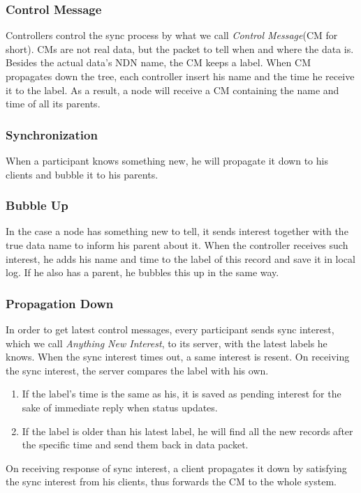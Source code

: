 \documentclass[conference]{IEEEtran}
\begin{document}
\subsubsection{Control Message}
Controllers control the sync process by what we call \emph{Control Message}(CM for short).
CMs are not real data, but the packet to tell when and where the data is.
Besides the actual data's NDN name, the CM keeps a label.
When CM propagates down the tree,
each controller insert his name and the time he receive it to the label.
As a result, a node will receive a CM containing the name and time of all its parents.

\subsubsection{Synchronization}
When a participant knows something new,
he will propagate it down to his clients and bubble it to his parents.

\subsubsection{Bubble Up}
In the case a node has something new to tell,
it sends interest together with the true data name to inform his parent about it.
When the controller receives such interest,
he adds his name and time to the label of this record and save it in local log.
If he also has a parent, he bubbles this up in the same way.

\subsubsection{Propagation Down}
In order to get latest control messages,
every participant sends sync interest, which we call \emph{Anything New Interest},
to its server, with the latest labels he knows.
When the sync interest times out, a same interest is resent.
On receiving the sync interest, the server compares the label with his own.
\begin{enumerate}{}
	\item If the label's time is the same as his,
it is saved as pending interest for the sake of immediate reply when status updates.
	\item If the label is older than his latest label,
he will find all the new records after the specific time and send them back in data packet.
\end{enumerate}
On receiving response of sync interest,
a client propagates it down by satisfying the sync interest from his clients,
thus forwards the CM to the whole system.
\end{document}
